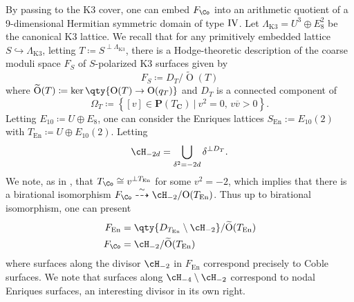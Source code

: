 \documentclass{amsart}
\renewcommand{\tilde}{\widetilde}
\begin{document}
\begin{remark}

By passing to the K3 cover, one can embed \(F_\Co\) into an arithmetic quotient of a 9-dimensional Hermitian symmetric domain of type \(\rm{IV}\). Let \(\Lambda_{\mathrm{K3}}= U^3 \oplus E_8^2\) be the canonical K3 lattice. We recall that for any primitively embedded lattice \(S\hookrightarrow\Lambda_{\mathrm{K3}}\), letting \(T \coloneqq S^{\perp \Lambda_{\mathrm{K3}}}\), there is a Hodge-theoretic description of the coarse moduli space \(F_S\) of \(S\)-polarized K3 surfaces given by \[
F_S \coloneqq D_T/\tilde{\operatorname{O}}(T)
\] where \(\tilde {\operatorname{O}}(T) \coloneqq\ker\qty{{\operatorname{O}}(T) \to {\operatorname{O}}(q_T)}\) and \(D_T\) is a connected component of \[
\Omega_T \coloneqq\left\{{[v]\in {\mathbf{P}}(T_{\mathbf{C}}) {~\mathrel{\Big\vert}~}v^2=0,\, v\overline{v} > 0}\right\}
.\] Letting \(E_{10} \coloneqq U \oplus E_8\), one can consider the Enriques lattices \(S_{\operatorname{En}} := E_{10}(2)\) with \(T_{\operatorname{En}} \coloneqq U \oplus E_{10}(2)\). Letting \[
\cH_{-2d} = \bigcup_{\delta^2 = -2d} \delta^{\perp D_T}
.\] We note, as in \cite{DK13}, that \(T_{\Co} \cong v^{\perp T_{\operatorname{En}}}\) for some \(v^2=-2\), which implies that there is a birational isomorphism \(F_{\Co} \overset{\sim}{\dashrightarrow}\cH_{-2}/{\operatorname{O}}(T_{\operatorname{En}})\). Thus up to birational isomorphism, one can present \begin{align*} F_{\operatorname{En}} &= \qty{D_{T_{\operatorname{En}}} \setminus \cH_{-2}} / \tilde {\operatorname{O}}(T_{\operatorname{En}}) \\ F_{\Co} &= \cH_{-2} / \tilde {\operatorname{O}}(T_{\operatorname{En}}) \\ \end{align*} where surfaces along the divisor \(\cH_{-2}\) in \(F_{\operatorname{En}}\) correspond precisely to Coble surfaces. We note that surfaces along \(\cH_{-4}\setminus \cH_{-2}\) correspond to nodal Enriques surfaces, an interesting divisor in its own right.

\end{remark}
\end{document}
